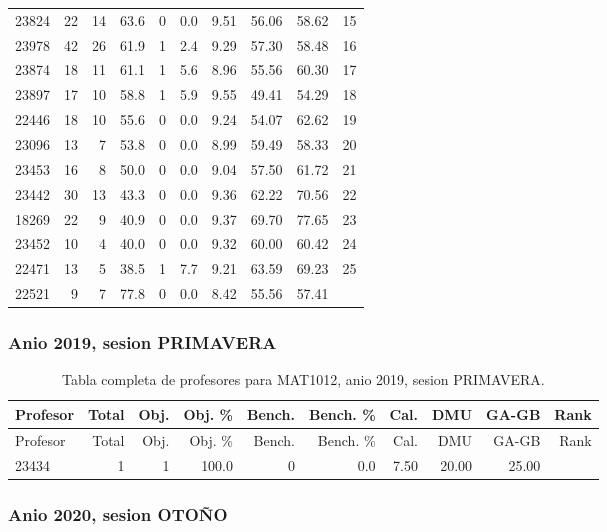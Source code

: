 \begin{longtable}{lrrrrrrrrr}
23824 & 22 & 14 & 63.6 & 0 & 0.0 & 9.51 & 56.06 & 58.62 & 15 \\
23978 & 42 & 26 & 61.9 & 1 & 2.4 & 9.29 & 57.30 & 58.48 & 16 \\
23874 & 18 & 11 & 61.1 & 1 & 5.6 & 8.96 & 55.56 & 60.30 & 17 \\
23897 & 17 & 10 & 58.8 & 1 & 5.9 & 9.55 & 49.41 & 54.29 & 18 \\
22446 & 18 & 10 & 55.6 & 0 & 0.0 & 9.24 & 54.07 & 62.62 & 19 \\
23096 & 13 & 7 & 53.8 & 0 & 0.0 & 8.99 & 59.49 & 58.33 & 20 \\
23453 & 16 & 8 & 50.0 & 0 & 0.0 & 9.04 & 57.50 & 61.72 & 21 \\
23442 & 30 & 13 & 43.3 & 0 & 0.0 & 9.36 & 62.22 & 70.56 & 22 \\
18269 & 22 & 9 & 40.9 & 0 & 0.0 & 9.37 & 69.70 & 77.65 & 23 \\
23452 & 10 & 4 & 40.0 & 0 & 0.0 & 9.32 & 60.00 & 60.42 & 24 \\
22471 & 13 & 5 & 38.5 & 1 & 7.7 & 9.21 & 63.59 & 69.23 & 25 \\
22521 & 9 & 7 & 77.8 & 0 & 0.0 & 8.42 & 55.56 & 57.41 &  \\
\bottomrule
\end{longtable}
\endgroup

\subsubsection{Anio 2019, sesion PRIMAVERA}

\begingroup
\scriptsize
\setlength{\tabcolsep}{3pt}
\begin{longtable}{lrrrrrrrrr}
\caption{Tabla completa de profesores para MAT1012, anio 2019, sesion PRIMAVERA.}\label{tab:prof-period-mat1012-2019-primavera}\\
\toprule
Profesor & Total & Obj. & Obj. \% & Bench. & Bench. \% & Cal. & DMU & GA-GB & Rank \\
\midrule
\endfirsthead
\toprule
Profesor & Total & Obj. & Obj. \% & Bench. & Bench. \% & Cal. & DMU & GA-GB & Rank \\
\midrule
\endhead
23434 & 1 & 1 & 100.0 & 0 & 0.0 & 7.50 & 20.00 & 25.00 &  \\
\bottomrule
\end{longtable}
\endgroup

\subsubsection{Anio 2020, sesion OTOÑO}

